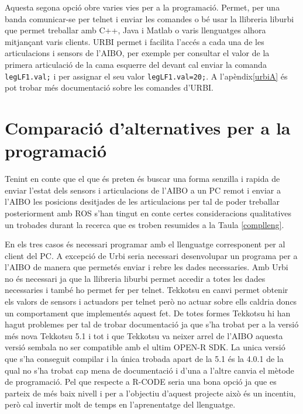 \documentclass[12pt,a4paper,final,twoside]{article}
\begin{document}
Aquesta segona opció obre varies vies per a la programació. Permet, per una banda comunicar-se per telnet i enviar les comandes o bé usar la llibreria liburbi que permet treballar amb C++, Java i Matlab o varis llenguatges alhora mitjançant varis clients.
URBI permet i facilita l'accés a cada una de les articulacions i sensors de l'AIBO, per exemple per consultar el valor de la primera articulació de la cama esquerre del devant cal enviar la comanda \texttt{legLF1.val;} i per assignar el seu valor \texttt{legLF1.val=20;}\cite{urbicmd}. A l'apèndix\ref{urbiA} és pot trobar més documentació sobre les comandes d'URBI.

\clearpage
\section{Comparació d'alternatives per a la programació}

Tenint en conte que el que és preten és buscar una forma senzilla i rapida de enviar l'estat dels sensors i articulacions de l'AIBO a un PC remot i enviar a l'AIBO les posicions desitjades de les articulacions per tal de poder treballar posteriorment amb ROS s'han tingut en conte certes consideracions qualitatives un trobades durant la recerca que es troben resumides a la Taula \ref{complleng}.

En els tres casos és necessari programar amb el llenguatge corresponent per al client del PC. A excepció de Urbi seria necessari desenvolupar un programa per a l'AIBO de manera que permetés enviar i rebre les dades necessaries. Amb Urbi no és necessari ja que la llibreria liburbi permet accedir a totes les dades necessaries i també ho permet fer per telnet. Tekkotsu en canvi permet obtenir els valors de sensors i actuadors per telnet però no actuar sobre ells caldria doncs un comportament que implementés aquest fet. De totes formes Tekkotsu hi han hagut problemes per tal de trobar documentació ja que s'ha trobat per a la versió més nova Tekkotsu 5.1 i tot i que Tekkotsu va neixer arrel de l'AIBO aquesta versió sembala no ser compatible amb el ultim OPEN-R SDK. La unica versió que s'ha conseguit compilar i la única trobada apart de la 5.1 és la 4.0.1 de la qual no s'ha trobat cap mena de documentació i d'una a l'altre canvia el mètode de programació.
Pel que respecte a R-CODE seria una bona opció ja que es parteix de més baix nivell i per a l'objectiu d'aquest projecte això és un incentiu, però cal invertir molt de temps en l'aprenentatge del llenguatge. 
\end{document}
